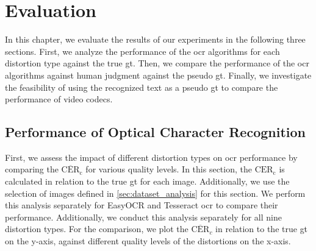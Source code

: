 \chapter{Evaluation}
\label{chap:evaluation}

In this chapter, we evaluate the results of our experiments in the following three sections.
First, we analyze the performance of the \gls{ocr} algorithms for each distortion type against the true \gls{gt}.
Then, we compare the performance of the \gls{ocr} algorithms against human judgment against the pseudo \gls{gt}.
Finally, we investigate the feasibility of using the recognized text as a pseudo \gls{gt} to compare the performance of video codecs.

\section{Performance of Optical Character Recognition}
\label{sec:ocr_performance}

First, we assess the impact of different distortion types on \gls{ocr} performance by comparing the $\overline{\text{CER}}_{\text{c}}$ for various quality levels.
In this section, the $\text{CER}_{\text{c}}$ is calculated in relation to the true \gls{gt} for each image.
Additionally, we use the selection of images defined in \autoref{sec:dataset_analysis} for this section.
We perform this analysis separately for EasyOCR and Tesseract \gls{ocr} to compare their performance.
Additionally, we conduct this analysis separately for all nine distortion types.
For the comparison, we plot the $\overline{\text{CER}}_{c}$ in relation to the true \gls{gt} on the y-axis, against different quality levels of the distortions on the x-axis.

